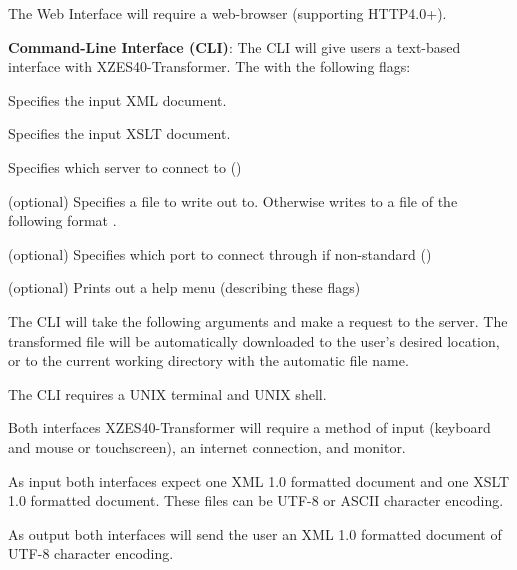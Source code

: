 \begin{description}
{        The Web Interface will require a web-browser (supporting HTTP4.0+).
    }
    \item {
        \textbf{Command-Line Interface (CLI)}:
        The CLI will give users a text-based interface with XZES40-Transformer.
        The with the following flags:
        \begin{description}
            \item {
              \textbf{}
              Specifies the input XML document.
            }
            \item {
              \textbf{}
              Specifies the input XSLT document.
            }
            \item {
              \textbf{}
              Specifies which server to connect to ()
            }
            \item {
              \textbf{} (optional)
              Specifies a file to write out to.  Otherwise writes to a file of the following format .
            }
            \item {
              \textbf{} (optional)
              Specifies which port to connect through if non-standard ()
            }
            \item {
              \textbf{} (optional)
              Prints out a help menu (describing these flags)
            }
        \end{description}

        The CLI will take the following arguments and make a  request to the server.
        The transformed file will be automatically downloaded to the user's desired location, or to the current working directory with the automatic file name.

        The CLI requires a UNIX terminal and UNIX shell.
    }
\end{description}

Both interfaces XZES40-Transformer will require a method of input (keyboard and mouse or touchscreen), an internet connection, and monitor.

As input both interfaces expect one XML 1.0 formatted document and one XSLT 1.0 formatted document.
These files can be UTF-8 or ASCII character encoding.

As output both interfaces will send the user an XML 1.0 formatted document of UTF-8 character encoding.

